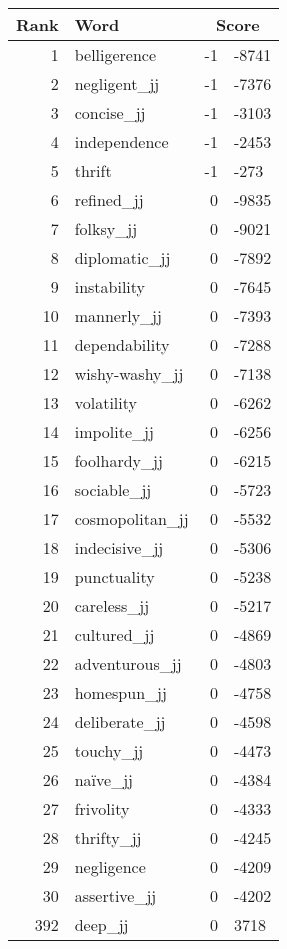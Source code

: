 \begin{longtable}[!htbp]{| rlr@{.}l |}
    \hline
    \textbf{Rank} & \textbf{Word} & \multicolumn{2}{c|}{\textbf{Score}} \\
    \hline
    \endhead
    1 & belligerence & -1 & -8741 \\
    2 & negligent\_jj & -1 & -7376 \\
    3 & concise\_jj & -1 & -3103 \\
    4 & independence & -1 & -2453 \\
    5 & thrift & -1 & -273 \\
    6 & refined\_jj & 0 & -9835 \\
    7 & folksy\_jj & 0 & -9021 \\
    8 & diplomatic\_jj & 0 & -7892 \\
    9 & instability & 0 & -7645 \\
    10 & mannerly\_jj & 0 & -7393 \\
    11 & dependability & 0 & -7288 \\
    12 & wishy-washy\_jj & 0 & -7138 \\
    13 & volatility & 0 & -6262 \\
    14 & impolite\_jj & 0 & -6256 \\
    15 & foolhardy\_jj & 0 & -6215 \\
    16 & sociable\_jj & 0 & -5723 \\
    17 & cosmopolitan\_jj & 0 & -5532 \\
    18 & indecisive\_jj & 0 & -5306 \\
    19 & punctuality & 0 & -5238 \\
    20 & careless\_jj & 0 & -5217 \\
    21 & cultured\_jj & 0 & -4869 \\
    22 & adventurous\_jj & 0 & -4803 \\
    23 & homespun\_jj & 0 & -4758 \\
    24 & deliberate\_jj & 0 & -4598 \\
    25 & touchy\_jj & 0 & -4473 \\
    26 & naïve\_jj & 0 & -4384 \\
    27 & frivolity & 0 & -4333 \\
    28 & thrifty\_jj & 0 & -4245 \\
    29 & negligence & 0 & -4209 \\
    30 & assertive\_jj & 0 & -4202 \\
    392 & deep\_jj & 0 & 3718 \\

\end{longtable}
